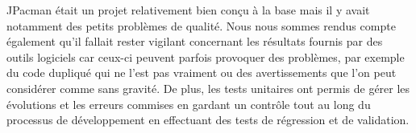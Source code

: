 \documentclass[12pt, openany]{report}
\begin{document}
JPacman était un projet relativement bien conçu à la base mais il y avait notamment des petits problèmes de qualité. Nous nous sommes rendus compte également qu'il fallait rester vigilant concernant les résultats fournis par des outils logiciels car ceux-ci peuvent parfois provoquer des problèmes, par exemple du code dupliqué qui ne l'est pas vraiment ou des avertissements que l'on peut considérer comme sans gravité. De plus, les tests unitaires ont permis de gérer les évolutions et les erreurs commises en gardant un contrôle tout au long du processus de développement en effectuant des tests de régression et de validation.





%
%
\end{document}
